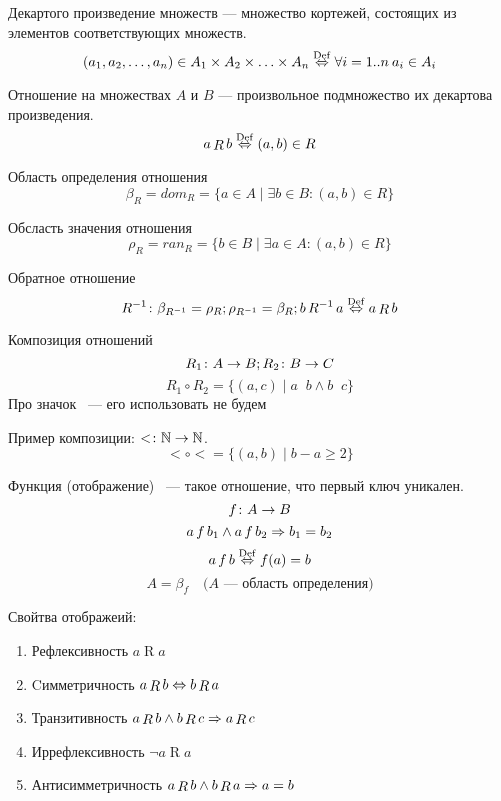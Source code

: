 \begin{Def}
Декартого произведение множеств --- множество кортежей, состоящих из элементов соответствующих множеств.
$$ \left(a_1, a_2, \ldots, a_n\right) \in A_1 \times A_2 \times \ldots \times A_n \stackrel{\mathrm{Def}}{\Leftrightarrow} \forall i=1..n\: a_i \in A_i $$
\end{Def}
\begin{Def}
Отношение на множествах $A$ и $B$ --- произвольное подмножество их декартова произведения.
$$ a \mathop{R} b \stackrel{\mathrm{Def}}{\Leftrightarrow} (a, b) \in R $$
\end{Def}
\begin{Def}
Область определения отношения 
$$ \beta_R = dom_R = \{a \in A \mid \exists b \in B\colon (a,b) \in R\} $$
\end{Def}
\begin{Def}
Обсласть значения отношения 
$$ \rho_R = ran_R =\{b \in B \mid \exists a \in A\colon (a, b) \in R\}$$
\end{Def}
\begin{Def}
Обратное отношение
$$R^{-1} \colon \beta_{R^{-1}} = \rho_R; \rho_{R^{-1}} = \beta_R; b \mathop{R^{-1}} a \stackrel{\mathrm{Def}}{\Leftrightarrow} a \mathop{R} b$$
\end{Def}
\begin{Def}
Композиция отношений
$$ R_1\colon A \rightarrow B; R_2\colon B \rightarrow C $$
$$ R_1 \circ R_2 = \{(a, c) \mid a \mathop{R_1} b \land b \mathop{R_2} c\} $$
Про значок ~--- его использовать не будем
\end{Def}

Пример композиции: $<\colon \mathbb{N} \rightarrow \mathbb{N}$. $$< \circ < = \{(a, b) \mid b - a \geqslant 2\}$$

\begin{Def}
Функция (отображение) ~--- такое отношение, что первый ключ уникален.
$$f\colon A \rightarrow B$$
$$ a \mathop{f} b_1 \land a \mathop{f} b_2 \Rightarrow b_1 = b_2 $$
$$ a \mathop{f} b \stackrel{\mathrm{Def}}{\Leftrightarrow} f(a) = b $$
$$ A = \beta_f \quad \text{($A$~--- область определения)}$$
\end{Def}

\begin{Def}Свойтва отображеий:
\begin{enumerate}
\item Рефлексивность $a \mathop{R} a$
\item Cимметричность $a \mathop{R} b \Leftrightarrow b \mathop{R} a$
\item Транзитивность $a \mathop{R} b \land b \mathop{R} c \Rightarrow a \mathop{R} c$
\item Иррефлексивность $\lnot a \mathop{R} a$
\item Антисимметричность $a \mathop{R} b \land b \mathop{R} a \Rightarrow a = b$
\end{enumerate}
\end{Def}

